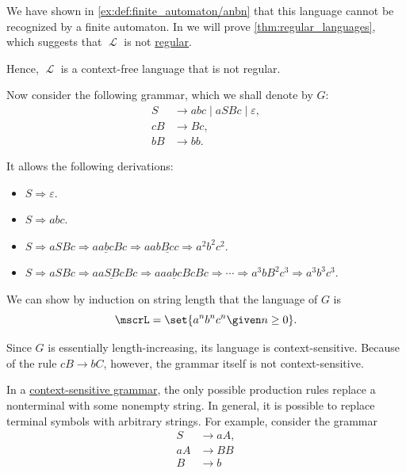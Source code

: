 \begin{example}
\begin{thmenum}
    We have shown in \cref{ex:def:finite_automaton/anbn} that this language cannot be recognized by a finite automaton. In  we will prove \cref{thm:regular_languages}, which suggests that \( \mscrL \) is not \hyperref[def:chomsky_hierarchy/regular]{regular}.

    Hence, \( \mscrL \) is a context-free language that is not regular.

     Now consider the following grammar, which we shall denote by \( G \):
    \begin{equation*}
      \begin{aligned}
        S &\to abc \mid aSBc \mid \varepsilon, \\
        cB &\to Bc, \\
        bB &\to bb.
      \end{aligned}
    \end{equation*}

    It allows the following derivations:
    \begin{itemize}
      \item \( S \Rightarrow \varepsilon \).
      \item \( S \Rightarrow abc \).
      \item \( S \Rightarrow aSBc \Rightarrow a\underline{abc}Bc \Rightarrow aab\underline{Bc}c \Rightarrow a^2 b^2 c^2 \).
      \item \( S \Rightarrow aSBc \Rightarrow a\underline{aSBc}Bc \Rightarrow aa\underline{abc}BcBc \Rightarrow \cdots \Rightarrow a^3 b B^2 c^3 \Rightarrow a^3 b^3 c^3 \).
    \end{itemize}

    We can show by induction on string length that the language of \( G \) is
    \begin{equation*}
      \mscrL = \set{ a^n b^n c^n \given n \geq 0 }.
    \end{equation*}

    Since \( G \) is essentially length-increasing, its language is context-sensitive. Because of the rule \( cB \to bC \), however, the grammar itself is not context-sensitive.

     In a \hyperref[def:chomsky_hierarchy/context_sensitive]{context-sensitive grammar}, the only possible production rules replace a nonterminal with some nonempty string. In general, it is possible to replace terminal symbols with arbitrary strings. For example, consider the grammar
    \begin{equation*}
      \begin{aligned}
         S &\to aA, \\
        aA &\to BB \\
         B &\to b \\
      \end{aligned}
    \end{equation*}


\end{thmenum}
\end{example}
